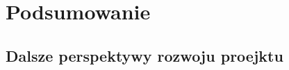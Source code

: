 \newpage\section{Podsumowanie} \label{sec:podsumowanie}
	\subsection{Dalsze perspektywy rozwoju proejktu}
